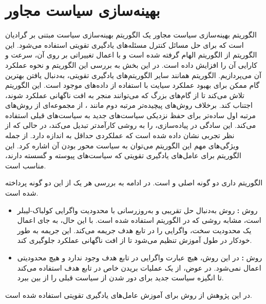 \section{بهینه‌سازی سیاست مجاور}
الگوریتم 
بهینه‌سازی سیاست مجاور
 یک الگوریتم بهینه‌سازی سیاست مبتنی بر گرادیان است که برای حل مسائل کنترل مسئله‌های یادگیری تقویتی استفاده می‌شود. این الگوریتم از الگوریتم 
 الهام گرفته شده است و با اعمال تغییراتی بر روی آن، سرعت و کارایی آن را افزایش داده است. در این بخش به بررسی این الگوریتم و نحوه عملکرد آن می‌پردازیم.
 الگوریتم  همانند سایر الگوریتم‌های یادگیری تقویتی، به‌دنبال یافتن بهترین گام ممکن برای بهبود عملکرد سیایت با استفاده از داده‌های موجود است. این الگوریتم تلاش می‌کند تا از گام‌های بزرگ که می‌توانند منجر به افت ناگهانی عملکرد شوند، اجتناب کند.
 برخلاف روش‌های پیچیده‌تر مرتبه دوم مانند 
 ، 
  از مجموعه‌ای از روش‌های مرتبه اول ساده‌تر برای حفظ نزدیکی سیاست‌های جدید به سیاست‌های قبلی استفاده می‌کند. این سادگی در پیاده‌سازی،  را به روشی کارآمدتر تبدیل می‌کند، در حالی که از نظر تجربی نشان داده شده است که عملکردی حداقل به اندازه  دارد.
  از جمله ویژگی‌های مهم این الگوریتم می‌توان به سیاست محور بودن آن اشاره کرد.
  این الگوریتم برای عامل‌های یادگیری تقویتی که سیاست‌های پیوسته و گسسته دارند، مناسب است.


  الگوریتم
  داری دو گونه اصلی 
    و
    است. در ادامه به بررسی هر یک از این دو گونه پرداخته شده است.
    \begin{itemize}
        \item
         روش\textbf{
         :}
        روش
         به‌دنبال حل تقریبی و به‌روز‌رسانی با 
        محدودیت واگرایی کولباک-لیبلر
است، مشابه روشی که در الگوریتم  استفاده شده است.
 با این حال، به جای اعمال یک محدودیت سخت،
  واگرایی  را در تابع هدف جریمه می‌کند. این جریمه به طور خودکار در طول آموزش تنظیم می‌شود تا از افت ناگهانی عملکرد جلوگیری کند.
    \item
     روش\textbf{
    :}
    در این روش، هیچ عبارت واگرایی  در تابع هدف وجود ندارد و هیچ محدودیتی اعمال نمی‌شود. در عوض،
     از یک عملیات بریدن خاص در تابع هدف استفاده می‌کند تا انگیزه سیاست جدید برای دور شدن از سیاست قبلی را از بین ببرد.    
    \end{itemize}
    در این پژوهش از روش 
    برای آموزش عامل‌های یادگیری تقویتی استفاده شده است.


